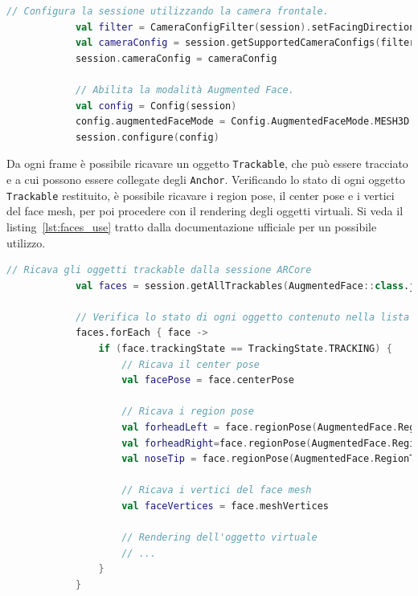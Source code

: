 \documentclass[crop=false, class=book]{standalone}
\begin{document}
	\begin{center}
		\begin{minipage}{0.95\textwidth}
			\begin{lstlisting}[caption={Configurazione della modalità Augmented Face.}, label={lst:af_session}, language=Kotlin]
			// Configura la sessione utilizzando la camera frontale.
			val filter = CameraConfigFilter(session).setFacingDirection(CameraConfig.FacingDirection.FRONT)
			val cameraConfig = session.getSupportedCameraConfigs(filter)[0]
			session.cameraConfig = cameraConfig
			
			// Abilita la modalità Augmented Face.
			val config = Config(session)
			config.augmentedFaceMode = Config.AugmentedFaceMode.MESH3D
			session.configure(config)
			\end{lstlisting}
		\end{minipage}
	\end{center}
	Da ogni frame è possibile ricavare un oggetto \verb|Trackable|, che può essere tracciato e a cui possono essere collegate degli \verb|Anchor|. Verificando lo stato di ogni oggetto \verb|Trackable| restituito, è possibile ricavare i region pose, il center pose e i vertici del face mesh, per poi procedere con il rendering degli oggetti virtuali. Si veda il listing~\vref{lst:faces_use} tratto dalla documentazione ufficiale per un possibile utilizzo.
	
	\begin{center}
		\begin{minipage}{0.95\textwidth}
			\begin{lstlisting}[caption={Utilizzo della modalità Augmented Face.}, label={lst:faces_use}, language=Kotlin]
			// Ricava gli oggetti trackable dalla sessione ARCore
			val faces = session.getAllTrackables(AugmentedFace::class.java)
			
			// Verifica lo stato di ogni oggetto contenuto nella lista di Trackable
			faces.forEach { face ->
				if (face.trackingState == TrackingState.TRACKING) {
					// Ricava il center pose
					val facePose = face.centerPose
					
					// Ricava i region pose
					val forheadLeft = face.regionPose(AugmentedFace.RegionType.FOREHEAD_LEFT)
					val forheadRight=face.regionPose(AugmentedFace.RegionType.FOREHEAD_RIGHT)
					val noseTip = face.regionPose(AugmentedFace.RegionType.NOSE_TIP)
					
					// Ricava i vertici del face mesh
					val faceVertices = face.meshVertices
					
					// Rendering dell'oggetto virtuale
					// ...
				}
			}
			\end{lstlisting}
		\end{minipage}
	\end{center}
	


	
	
\end{document}
